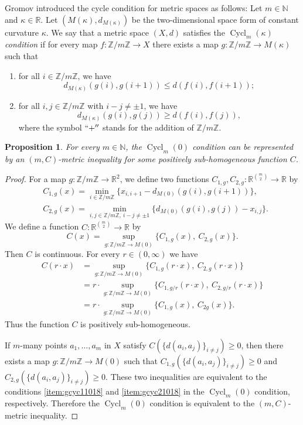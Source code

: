 \documentclass[a4paper, 12pt]{amsart}
\theoremstyle{plain}
\newtheorem{prop}[thm]{Proposition}
\theoremstyle{definition}
\theoremstyle{remark}
\newcommand{\nn}{\mathbb{N}}
\newcommand{\zz}{\mathbb{Z}}
\newcommand{\rr}{\mathbb{R}}
\DeclareMathOperator{\cycl}{Cycl}
\begin{document}
Gromov
 \cite{MR1871000} 
introduced the cycle condition for metric spaces as follows:  
Let 
$m\in \nn$ 
and 
$\kappa\in \rr$. 
Let 
$(M(\kappa), d_{M(\kappa)})$ 
be the two-dimensional space form of 
constant  curvature 
$\kappa$. 
We say that a metric space 
$(X, d)$ 
satisfies the 
\emph{$\cycl_m(\kappa)$ condition}
if for every map 
$f\colon \zz/m\zz\to X$ 
there exists a map 
$g\colon  \zz/m\zz\to M(\kappa)$ 
such that 
\begin{enumerate}[label=\text{(\arabic*)}]
	\item\label{item:gcyc11018}
	for all 
	$i\in \zz/m\zz$, 
	we have 
\[
	d_{M(\kappa)}(g(i), g(i+1))\le d(f(i), f(i+1));
\] 
	\item\label{item:gcyc21018}
	 for all 
	$i, j\in \zz/m\zz$ 
	with 
	$i-j\neq \pm 1$, 
	we have 
\[
	d_{M(\kappa)}(g(i), g(j))\ge d(f(i), f(j)), 
\]
where the symbol 
$``+''$ 
stands for the addition of 
$\zz/m\zz$. 
\end{enumerate}
\begin{prop}
For every  
$m\in \nn$, 
the 
$\cycl_{m}(0)$  
condition can be represented by an 
$(m, C)$-metric inequality 
for some positively sub-homogeneous function
 $C$.  
\end{prop}
\begin{proof}
For a map 
$g\colon  \zz/m\zz\to \rr^2$, 
we define two functions 
$C_{1, g}, C_{2, g}:\rr^{\binom{m}{2}}\to \rr$ 
by 
\begin{align*}
	&C_{1, g}(x)=
	\min_{i\in \zz/m\zz}\{x_{i, i+1}-d_{M(0)}(g(i), g(i+1))\}, \\
	&C_{2, g}(x)=
	\min_{i, j\in\zz/m\zz,\  i-j\neq \pm1 }\{d_{M(0)}(g(i), g(j))-x_{i, j}\}. 
\end{align*}
We define a function  
$C\colon \rr^{\binom{m}{2}}\to \rr$ 
by 
\[
C(x)=
	\sup_{g:\zz/m\zz\to M(0)}
	\{
	C_{1, g}(x), \ 
	C_{2,  g}(x)
	\}.
\]
Then 
$C$ 
is continuous. 
For every 
$r\in (0, \infty)$ 
we have 
\begin{align*}
C(r\cdot x)&=\sup_{g:\zz/m\zz\to M(0)}
	\{
	C_{1, g}(r\cdot x), \ 
	C_{2,  g}(r\cdot x)
	\}\\
	&=
	r\cdot \sup_{g:\zz/m\zz\to M(0)}
	\{
	C_{1, g/r}(r\cdot x), \ 
	C_{2,  g/r}(r\cdot x)
	\}\\
	&=
	r\cdot \sup_{g:\zz/m\zz\to M(0)}
	\{
	C_{1, g}( x), \ 
	C_{2 g}(x)
	\}. 
\end{align*}
Thus the function 
$C$ 
is  positively sub-homogeneous. 




If 
 $m$-many 
  points 
$a_{1}, \dots, a_{m}$ 
in 
$X$ 
satisfy 
 $C(\{d(a_i, a_j)\}_{i\neq j})\ge 0$, 
 then 
there exists a map 
$g\colon  \zz/m\zz\to M(0)$ 
such that 
$C_{1, g}(\{d(a_i, a_j)\}_{i \neq j})\ge 0$ 
and 
$C_{2, g}(\{d(a_i, a_j)\}_{i \neq j})\ge 0$. 
These two inequalities are equivalent to the conditions 
\ref{item:gcyc11018}
and 
\ref{item:gcyc21018} 
in the $\cycl_m(0)$
 condition, respectively. 
Therefore the 
$\cycl_m(0)$
 condition is equivalent to the 
 $(m, C)$-metric inequality. 
\end{proof}
\end{document}

